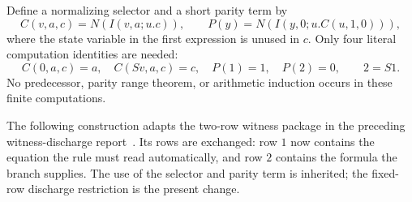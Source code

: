 Define a normalizing selector and a short parity term by
\[
 C(v,a,c)=N(I(v,a;u.c)),\qquad
 P(y)=N(I(y,0;u.C(u,1,0))),
\]
where the state variable in the first expression is unused in $c$.
Only four literal computation identities are needed:
\begin{equation}
 C(0,a,c)=a,\quad C(Sv,a,c)=c,\quad
 P(1)=1,\quad P(2)=0,\qquad 2=S1.
 \label{eq:row-endpoints}
\end{equation}
No predecessor, parity range theorem, or arithmetic induction occurs in
these finite computations.

The following construction adapts the two-row witness package in the
preceding witness-discharge report~\cite{prior}.  Its rows are
exchanged: row $1$ now contains the equation the rule must read
automatically, and row $2$ contains the formula the branch supplies.
The use of the selector and parity term is inherited; the fixed-row
discharge restriction is the present change.


